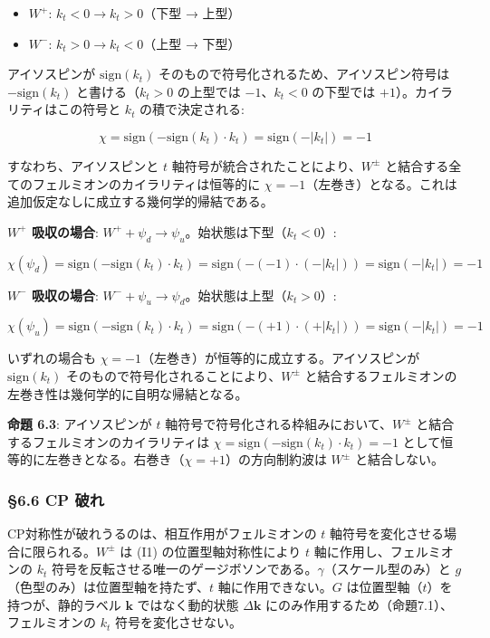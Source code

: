 \documentclass[
  a4paper,11pt]{ltjsarticle}
\providecommand{\tightlist}{%
  \setlength{\itemsep}{0pt}\setlength{\parskip}{0pt}}
\theoremstyle{definition}
\theoremstyle{remark}
\begin{document}
\begin{itemize}
\tightlist
\item
  \(W^+\): \(k_t < 0 \to k_t > 0\)（下型 → 上型）
\item
  \(W^-\): \(k_t > 0 \to k_t < 0\)（上型 → 下型）
\end{itemize}

アイソスピンが \(\mathrm{sign}(k_t)\)
そのもので符号化されるため、アイソスピン符号は \(-\mathrm{sign}(k_t)\)
と書ける（\(k_t > 0\) の上型では \(-1\)、\(k_t < 0\) の下型では
\(+1\)）。カイラリティはこの符号と \(k_t\) の積で決定される:

\[\chi = \mathrm{sign}(-\mathrm{sign}(k_t) \cdot k_t) = \mathrm{sign}(-|k_t|) = -1\]

すなわち、アイソスピンと \(t\) 軸符号が統合されたことにより、\(W^{\pm}\)
と結合する全てのフェルミオンのカイラリティは恒等的に
\(\chi = -1\)（左巻き）となる。これは追加仮定なしに成立する幾何学的帰結である。

\textbf{\(W^+\) 吸収の場合}:
\(W^+ + \psi_d \to \psi_u\)。始状態は下型（\(k_t < 0\)）:

\[\chi(\psi_d) = \mathrm{sign}(-\mathrm{sign}(k_t) \cdot k_t) = \mathrm{sign}(-(-1) \cdot (-|k_t|)) = \mathrm{sign}(-|k_t|) = -1\]

\textbf{\(W^-\) 吸収の場合}:
\(W^- + \psi_u \to \psi_d\)。始状態は上型（\(k_t > 0\)）:

\[\chi(\psi_u) = \mathrm{sign}(-\mathrm{sign}(k_t) \cdot k_t) = \mathrm{sign}(-(+1) \cdot (+|k_t|)) = \mathrm{sign}(-|k_t|) = -1\]

いずれの場合も \(\chi = -1\)（左巻き）が恒等的に成立する。アイソスピンが
\(\mathrm{sign}(k_t)\) そのもので符号化されることにより、\(W^{\pm}\)
と結合するフェルミオンの左巻き性は幾何学的に自明な帰結となる。

\textbf{命題 6.3}: アイソスピンが \(t\)
軸符号で符号化される枠組みにおいて、\(W^{\pm}\)
と結合するフェルミオンのカイラリティは
\(\chi = \mathrm{sign}(-\mathrm{sign}(k_t) \cdot k_t) = -1\)
として恒等的に左巻きとなる。右巻き（\(\chi = +1\)）の方向制約波は
\(W^{\pm}\) と結合しない。

\subsubsection{§6.6 CP 破れ}\label{cp-ux7834ux308c}

CP対称性が破れうるのは、相互作用がフェルミオンの \(t\)
軸符号を変化させる場合に限られる。\(W^{\pm}\) は (I1)
の位置型軸対称性により \(t\) 軸に作用し、フェルミオンの \(k_t\)
符号を反転させる唯一のゲージボソンである。\(\gamma\)（スケール型のみ）と
\(g\)（色型のみ）は位置型軸を持たず、\(t\) 軸に作用できない。\(G\)
は位置型軸（\(t\)）を持つが、静的ラベル \(\mathbf{k}\) ではなく動的状態
\(\Delta\mathbf{k}\) にのみ作用するため（命題7.1）、フェルミオンの
\(k_t\) 符号を変化させない。
\end{document}
